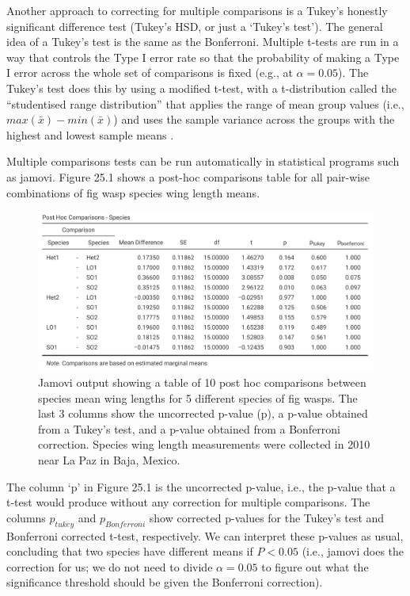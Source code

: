 \documentclass[
  openany]{krantz}
\begin{document}
Another approach to correcting for multiple comparisons is a Tukey's honestly significant difference test (Tukey's HSD, or just a `Tukey's test').
The general idea of a Tukey's test is the same as the Bonferroni.
Multiple t-tests are run in a way that controls the Type I error rate so that the probability of making a Type I error across the whole set of comparisons is fixed (e.g., at \(\alpha = 0.05\)).
The Tukey's test does this by using a modified t-test, with a t-distribution called the ``studentised range distribution'' that applies the range of mean group values (i.e., \(max(\bar{x}) - min(\bar{x})\)) and uses the sample variance across the groups with the highest and lowest sample means \citep{Tukey1949, Box1978}.

Multiple comparisons tests can be run automatically in statistical programs such as jamovi.
Figure 25.1 shows a post-hoc comparisons table for all pair-wise combinations of fig wasp species wing length means.

\begin{figure}
\includegraphics[width=1\linewidth]{img/jamovi_multiple_comparisons} \caption{Jamovi output showing a table of 10 post hoc comparisons between species mean wing lengths for 5 different species of fig wasps. The last 3 columns show the uncorrected p-value (p), a p-value obtained from a Tukey's test, and a p-value obtained from a Bonferroni correction. Species wing length measurements were collected in 2010 near La Paz in Baja, Mexico.}\label{fig:unnamed-chunk-102}
\end{figure}

The column `p' in Figure 25.1 is the uncorrected p-value, i.e., the p-value that a t-test would produce without any correction for multiple comparisons.
The columns \(p_{tukey}\) and \(p_{Bonferroni}\) show corrected p-values for the Tukey's test and Bonferroni corrected t-test, respectively.
We can interpret these p-values as usual, concluding that two species have different means if \(P < 0.05\) (i.e., jamovi does the correction for us; we do not need to divide \(\alpha = 0.05\) to figure out what the significance threshold should be given the Bonferroni correction).
\end{document}
